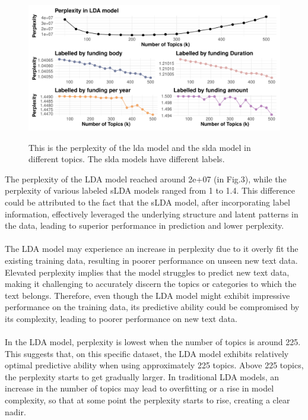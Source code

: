 \documentclass[12pt,twoside]{article}
\begin{document}
\begin{figure}[h]
    \centering
    \includegraphics[width=15cm]{./figures/lda-slda}\\[0.2cm] 
    \caption{This is the perplexity of the lda model and the slda model in different topics. The slda models have different labels.}

\end{figure}


The perplexity of the LDA model reached around 2e+07 (in Fig.3), while the perplexity of various labeled sLDA models ranged from 1 to 1.4. This difference could be attributed to the fact that the sLDA model, after incorporating label information, effectively leveraged the underlying structure and latent patterns in the data, leading to superior performance in prediction and lower perplexity.\\\\

The LDA model may experience an increase in perplexity due to it overly fit the existing training data, resulting in poorer performance on unseen new text data. Elevated perplexity implies that the model struggles to predict new text data, making it challenging to accurately discern the topics or categories to which the text belongs. Therefore, even though the LDA model might exhibit impressive performance on the training data, its predictive ability could be compromised by its complexity, leading to poorer performance on new text data.\\\\

In the LDA model, perplexity is lowest when the number of topics is around 225. This suggests that, on this specific dataset, the LDA model exhibits relatively optimal predictive ability when using approximately 225 topics. Above 225 topics, the perplexity starts to get gradually larger. In traditional LDA models, an increase in the number of topics may lead to overfitting or a rise in model complexity, so that at some point the perplexity starts to rise, creating a clear nadir.\\\\
\end{document}
